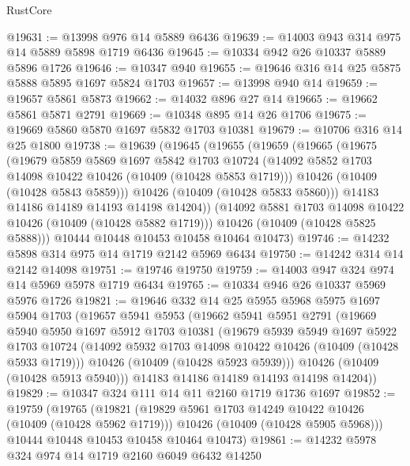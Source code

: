 \begin{lexlean}{RustCore}
\begin{coremodule}
@19631 := @13998 @976 @14 @5889 @6436
@19639 := @14003 @943 @314 @975 @14 @5889 @5898 @1719 @6436
@19645 := @10334 @942 @26 @10337 @5889 @5896 @1726
@19646 := @10347 @940
@19655 := @19646 @316 @14 @25 @5875 @5888 @5895 @1697 @5824 @1703
@19657 := @13998 @940 @14
@19659 := @19657 @5861 @5873
@19662 := @14032 @896 @27 @14
@19665 := @19662 @5861 @5871 @2791
@19669 := @10348 @895 @14 @26 @1706
@19675 := @19669 @5860 @5870 @1697 @5832 @1703 @10381
@19679 := @10706 @316 @14 @25 @1800
@19738 := @19639
    (@19645
      (@19655
        (@19659
          (@19665
            (@19675
              (@19679
                @5859
                @5869
                @1697
                @5842
                @1703
                @10724
                (@14092 @5852 @1703 @14098 @10422 @10426 (@10409 (@10428 @5853 @1719)))
                @10426
                (@10409 (@10428 @5843 @5859)))
              @10426
              (@10409 (@10428 @5833 @5860)))
            @14183
            @14186
            @14189
            @14193
            @14198
            @14204))
        (@14092 @5881 @1703 @14098 @10422 @10426 (@10409 (@10428 @5882 @1719)))
        @10426
        (@10409 (@10428 @5825 @5888)))
      @10444
      @10448
      @10453
      @10458
      @10464
      @10473)
@19746 := @14232 @5898 @314 @975 @14 @1719 @2142 @5969 @6434
@19750 := @14242 @314 @14 @2142 @14098
@19751 := @19746 @19750
@19759 := @14003 @947 @324 @974 @14 @5969 @5978 @1719 @6434
@19765 := @10334 @946 @26 @10337 @5969 @5976 @1726
@19821 := @19646
    @332
    @14
    @25
    @5955
    @5968
    @5975
    @1697
    @5904
    @1703
    (@19657
      @5941
      @5953
      (@19662
        @5941
        @5951
        @2791
        (@19669
          @5940
          @5950
          @1697
          @5912
          @1703
          @10381
          (@19679
            @5939
            @5949
            @1697
            @5922
            @1703
            @10724
            (@14092 @5932 @1703 @14098 @10422 @10426 (@10409 (@10428 @5933 @1719)))
            @10426
            (@10409 (@10428 @5923 @5939)))
          @10426
          (@10409 (@10428 @5913 @5940)))
        @14183
        @14186
        @14189
        @14193
        @14198
        @14204))
@19829 := @10347 @324 @111 @14 @11 @2160 @1719 @1736 @1697
@19852 := @19759
    (@19765
      (@19821
        (@19829 @5961 @1703 @14249 @10422 @10426 (@10409 (@10428 @5962 @1719)))
        @10426
        (@10409 (@10428 @5905 @5968)))
      @10444
      @10448
      @10453
      @10458
      @10464
      @10473)
@19861 := @14232 @5978 @324 @974 @14 @1719 @2160 @6049 @6432 @14250

\end{coremodule}
\end{lexlean}
